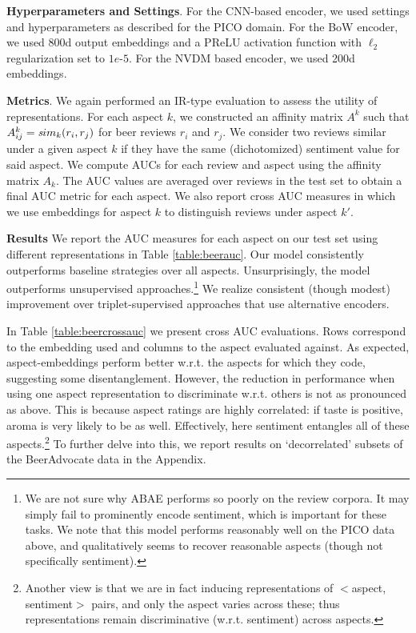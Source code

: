 \documentclass[11pt,a4paper]{article}
\begin{document}
\vspace{.25em}
\noindent  \textbf{Hyperparameters and Settings}. For the CNN-based encoder, we used settings and hyperparameters as described for the PICO domain. For the BoW encoder, we used 800d output embeddings and a PReLU activation function with $\ell_2$ regularization set to $1e$-$5$. For the NVDM based encoder, we used 200d embeddings. %

\vspace{.25em}
\noindent \textbf{Metrics}. We again performed an IR-type evaluation to assess the utility of representations. For each aspect $k$, we constructed an affinity matrix $A^k$ such that $A^k_{ij} = {\textit sim}_k(r_i, r_j)$ for beer reviews $r_i$ and $r_j$. We consider two reviews similar under a given aspect $k$ if they have the same (dichotomized) sentiment value for said aspect. We compute AUCs for each review and aspect using the affinity matrix $A_k$. The AUC values are averaged over reviews in the test set to obtain a final AUC metric for each aspect. We also report cross AUC measures in which we use embeddings for aspect $k$ to distinguish reviews under aspect $k'$. %

\vspace{.25em}
\noindent \textbf{Results} We report the AUC measures for each aspect on our test set using different representations in Table \ref{table:beerauc}. Our model consistently outperforms baseline strategies over all aspects. Unsurprisingly, the model outperforms unsupervised approaches.\footnote{We are not sure why ABAE \cite{he-2017} performs so poorly on the review corpora. It may simply fail to prominently encode sentiment, which is important for these tasks. We note that this model performs reasonably well on the PICO data above, and qualitatively seems to recover reasonable aspects (though not specifically sentiment).} We realize consistent (though modest) improvement over triplet-supervised approaches that use alternative encoders. %

In Table \ref{table:beercrossauc} we present cross AUC evaluations. Rows correspond to the embedding used and columns to the aspect evaluated against. As expected, aspect-embeddings perform better w.r.t. the aspects for which they code, suggesting some disentanglement. However, the reduction in performance when using one aspect representation to discriminate w.r.t. others is not as pronounced as above. This is because aspect ratings are highly correlated: if taste is positive, aroma is very likely to be as well. Effectively, here sentiment entangles all of these aspects.\footnote{Another view is that we are in fact inducing representations of $<$aspect, sentiment$>$ pairs, and only the aspect varies across these; thus representations remain discriminative (w.r.t. sentiment) across aspects.} To further delve into this, we report results on `decorrelated' subsets of the BeerAdvocate data in the Appendix. 
\end{document}
